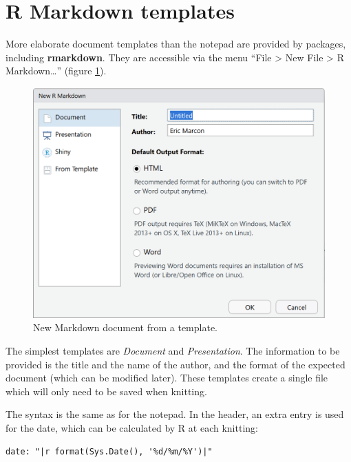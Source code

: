 \documentclass[
  12pt,
  american,
  a4paper,
  extrafontsizes,onecolumn,openright
  ]{memoir}
\begin{document}
\section{R Markdown templates}\label{r-markdown-templates}

More elaborate document templates than the notepad are provided by packages, including \textbf{rmarkdown}.
They are accessible via the menu \enquote{File \textgreater{} New File \textgreater{} R Markdown\ldots{}} (figure \ref{fig:e-rmd1}).



\scriptsize

\begin{figure}

{\centering \includegraphics[width=0.8\linewidth]{images/e-rmd1} 

}

\caption{New Markdown document from a template.}\label{fig:e-rmd1}
\end{figure}

\normalsize

The simplest templates are \emph{Document} and \emph{Presentation}.
The information to be provided is the title and the name of the author, and the format of the expected document (which can be modified later).
These templates create a single file which will only need to be saved when knitting.

The syntax is the same as for the notepad.
In the header, an extra entry is used for the date, which can be calculated by R at each knitting:

\begin{verbatim}
date: "|r format(Sys.Date(), '%d/%m/%Y')|"
\end{verbatim}
\end{document}

